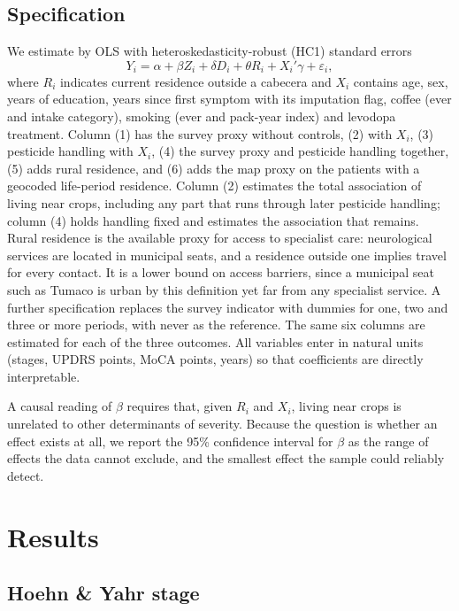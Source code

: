 \documentclass[11pt,a4paper]{article}
\begin{document}
\subsection{Specification}

We estimate by OLS with heteroskedasticity-robust (HC1) standard errors
\begin{equation}
Y_i = \alpha + \beta Z_i + \delta D_i + \theta R_i + X_i'\gamma + \varepsilon_i,
\end{equation}
where $R_i$ indicates current residence outside a cabecera and $X_i$ contains age, sex, years of education, years since first symptom with its imputation flag, coffee (ever and intake category), smoking (ever and pack-year index) and levodopa treatment. Column (1) has the survey proxy without controls, (2) with $X_i$, (3) pesticide handling with $X_i$, (4) the survey proxy and pesticide handling together, (5) adds rural residence, and (6) adds the map proxy on the patients with a geocoded life-period residence. Column (2) estimates the total association of living near crops, including any part that runs through later pesticide handling; column (4) holds handling fixed and estimates the association that remains. Rural residence is the available proxy for access to specialist care: neurological services are located in municipal seats, and a residence outside one implies travel for every contact. It is a lower bound on access barriers, since a municipal seat such as Tumaco is urban by this definition yet far from any specialist service. A further specification replaces the survey indicator with dummies for one, two and three or more periods, with never as the reference. The same six columns are estimated for each of the three outcomes. All variables enter in natural units (stages, UPDRS points, MoCA points, years) so that coefficients are directly interpretable.

A causal reading of $\beta$ requires that, given $R_i$ and $X_i$, living near crops is unrelated to other determinants of severity. Because the question is whether an effect exists at all, we report the 95\% confidence interval for $\beta$ as the range of effects the data cannot exclude, and the smallest effect the sample could reliably detect.

\section{Results}

\subsection{Hoehn \& Yahr stage}
\end{document}
